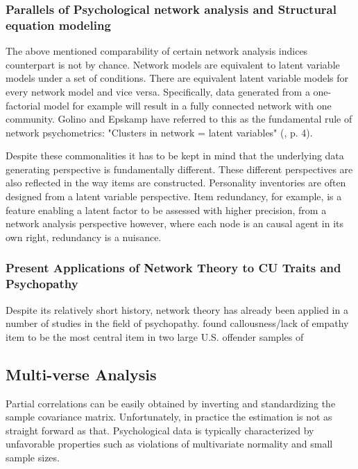 \subsubsection{Parallels of Psychological network analysis and Structural equation modeling}
The above mentioned comparability of certain network analysis indices counterpart is not by chance.
Network models are equivalent to latent variable models under a set of conditions.
There are equivalent latent variable models for every network model and vice versa.
Specifically, data generated from a one-factorial model for example will result in a fully connected network with one community. 
Golino and Epskamp have referred to this as the fundamental rule of network psychometrics: "Clusters in network = latent variables" (, p. 4).

Despite these commonalities it has to be kept in mind that the underlying data generating perspective is fundamentally different. 
These different perspectives are also reflected in the way items are constructed. 
Personality inventories are often designed from a latent variable perspective.
Item redundancy, for example, is a feature enabling a latent factor to be assessed with higher precision,
from a network analysis perspective however, where each node is an causal agent in its own right, redundancy is a nuisance. 


\subsubsection{Present Applications of Network Theory to CU Traits and Psychopathy}
Despite its relatively short history, network theory has already been applied in a number of studies in the field of psychopathy.
\textcites{verschuere_what_2018} found callousness/lack of empathy item to be the most central item in two large U.S. offender samples of 
\textcite{bronchain_network_2019} 

\subsection{Multi-verse Analysis}

Partial correlations can be easily obtained by inverting and standardizing the sample covariance matrix. 
Unfortunately, in practice the estimation is not as straight forward as that.
Psychological data is typically characterized by unfavorable properties such as violations of multivariate normality and
small sample sizes.


